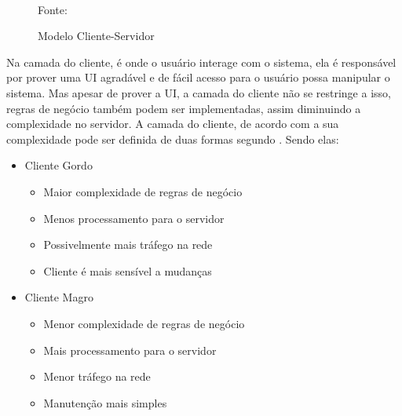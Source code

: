 \begin{figure}[h!]
\centering
\caption{Modelo Cliente-Servidor}
\\
{\footnotesize Fonte: \cite{devmediaMultiCamadaP12018}}
\label{f_c2_cliente_servidor}
\end{figure}

Na camada do cliente, é onde o usuário interage com o sistema, ela é responsável por prover uma \ac{UI} agradável e de fácil acesso para o usuário possa manipular o sistema. Mas apesar de prover a \ac{UI}, a camada do cliente não se restringe a isso, regras de negócio também podem ser implementadas, assim diminuindo a complexidade no servidor. A camada do cliente, de acordo com a sua  complexidade pode ser definida de duas formas segundo \cite{devmediaMultiCamadaP12018}. Sendo elas:

\begin{itemize}
    \item Cliente Gordo
    \begin{itemize}
        \item Maior complexidade de regras de negócio
        \item Menos processamento para o servidor
        \item Possivelmente mais tráfego na rede
        \item Cliente é mais sensível a mudanças
    \end{itemize}
    \item Cliente Magro
    \begin{itemize}
        \item Menor complexidade de regras de negócio
        \item Mais processamento para o servidor
        \item Menor tráfego na rede
        \item Manutenção mais simples
    \end{itemize}
\end{itemize}

